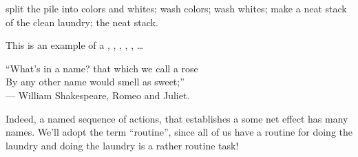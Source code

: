 \begin{codebox}
\li split the pile into colors and whites;
\li wash colors;
\li wash whites;
\li make a neat stack of the clean laundry;
\li \Return the neat stack.
\end{codebox}

This is an example of a , , ,
, , \ldots

\begin{flushright}

``What's in a name? that which we call a rose\\
By any other name would smell as sweet;''\\
--- William Shakespeare, Romeo and Juliet.

\end{flushright}

Indeed, a named sequence of actions, that establishes a some net effect has
many names. We'll adopt the term ``routine'', since all of us have a routine
for doing the laundry and doing the laundry is a rather routine task!
